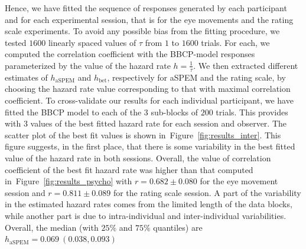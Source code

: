 \documentclass[12pt,english]{article}%
\newcommand{\seeFig}[1]{Figure~\ref{fig:#1}}
\newcommand{\CP}[1]{\textbf{\textcolor{green}{[CP: #1]}}}
\begin{document}
Hence, we have fitted the sequence of responses generated by each participant and
for each experimental session, that is for the eye movements and the rating scale experiments.
To avoid any possible bias from the fitting procedure, 
we tested $1600$ linearly spaced values of $\tau$ from $1$ to $1600$ trials.
For each, we computed the correlation coefficient with the BBCP-model responses parameterized 
by the value of the hazard rate $h = \frac 1 \tau$.
We then extracted different estimates of $h_{\text{aSPEM}}$ and $h_{\text{bet}}$,
respectively for aSPEM and the rating scale,
by choosing the hazard rate value corresponding to that with maximal correlation coefficient.
To cross-validate our results for each individual participant,
we have fitted the BBCP model to each of the $3$ sub-blocks of $200$ trials.
This provides with $3$ values of the best fitted hazard rate for each session and observer.
The scatter plot of the best fit values is shown in~\seeFig{results_inter}.
This figure suggests, in the first place, that there is some variability
in the best fitted value of the hazard rate in both sessions.
Overall, the value of correlation coefficient of the best fit hazard rate
was higher than that computed in~\seeFig{results_psycho}
with $r = 0.682 \pm 0.080 $ for the eye movement session 
 and $r = 0.811 \pm 0.089 $ for the rating scale session.
A part of the variability in the estimated hazard rates comes 
from the limited length of the data blocks,
while another part is due to intra-individual and inter-individual variabilities.
Overall, the median (with $25\%$ and $75\%$ quantiles) are $h_{\text{aSPEM}} = 0.069 ~ (0.038, 0.093)$ %
\end{document}
